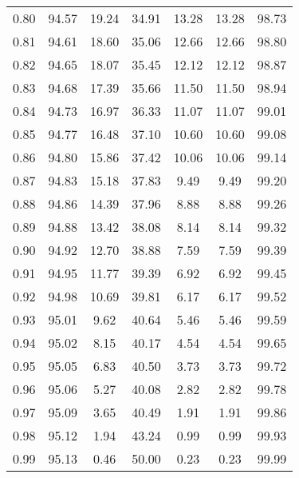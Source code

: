 \begin{tabular}{|c|c|c|c|c|c|c|}
      0.80 &     94.57 &     19.24 &      34.91 &   13.28 &      13.28 &         98.73 \\
      0.81 &     94.61 &     18.60 &      35.06 &   12.66 &      12.66 &         98.80 \\
      0.82 &     94.65 &     18.07 &      35.45 &   12.12 &      12.12 &         98.87 \\
      0.83 &     94.68 &     17.39 &      35.66 &   11.50 &      11.50 &         98.94 \\
      0.84 &     94.73 &     16.97 &      36.33 &   11.07 &      11.07 &         99.01 \\
      0.85 &     94.77 &     16.48 &      37.10 &   10.60 &      10.60 &         99.08 \\
      0.86 &     94.80 &     15.86 &      37.42 &   10.06 &      10.06 &         99.14 \\
      0.87 &     94.83 &     15.18 &      37.83 &    9.49 &       9.49 &         99.20 \\
      0.88 &     94.86 &     14.39 &      37.96 &    8.88 &       8.88 &         99.26 \\
      0.89 &     94.88 &     13.42 &      38.08 &    8.14 &       8.14 &         99.32 \\
      0.90 &     94.92 &     12.70 &      38.88 &    7.59 &       7.59 &         99.39 \\
      0.91 &     94.95 &     11.77 &      39.39 &    6.92 &       6.92 &         99.45 \\
      0.92 &     94.98 &     10.69 &      39.81 &    6.17 &       6.17 &         99.52 \\
      0.93 &     95.01 &      9.62 &      40.64 &    5.46 &       5.46 &         99.59 \\
      0.94 &     95.02 &      8.15 &      40.17 &    4.54 &       4.54 &         99.65 \\
      0.95 &     95.05 &      6.83 &      40.50 &    3.73 &       3.73 &         99.72 \\
      0.96 &     95.06 &      5.27 &      40.08 &    2.82 &       2.82 &         99.78 \\
      0.97 &     95.09 &      3.65 &      40.49 &    1.91 &       1.91 &         99.86 \\
      0.98 &     95.12 &      1.94 &      43.24 &    0.99 &       0.99 &         99.93 \\
      0.99 &     95.13 &      0.46 &      50.00 &    0.23 &       0.23 &         99.99 \\
\bottomrule
\end{tabular}
